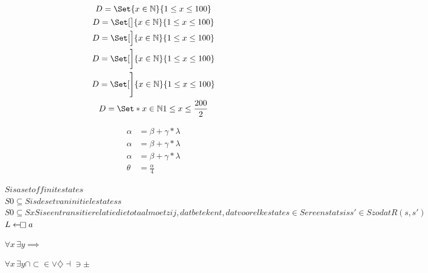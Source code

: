 \documentclass[11pt]{report} %
\newcommand{\numberset}[1]{\mathbb{#1}}
\newcommand{\nat}{\numberset{N}}
\newcommand{\stock}{\gets\mathrel{\mkern-2.4mu\mathop\square}}
\let\mtproforall\forall %
\let\mtproexists\exists %
\begin{document}
\begin{gather*}
D=\Set{x\in\nat}{1\le x\le 100}\\
D=\Set[\big]{x\in\nat}{1\le x\le 100}\\
D=\Set[\Big]{x\in\nat}{1\le x\le 100}\\
D=\Set[\bigg]{x\in\nat}{1\le x\le 100}\\
D=\Set[\Bigg]{x\in\nat}{1\le x\le 100}\\
D=\Set*{x\in\nat}{1\le x\le \frac{200}{2}}
\end{gather*}

\begin{align}
    \alpha &= \beta + \gamma * \lambda \\
     \alpha &= \beta + \gamma * \lambda \\
      \alpha &= \beta + \gamma * \lambda \\
    \theta &= \frac{\alpha}{4}
\end{align} 

%
%
%




$S is a set of finite states$\\
$S0 \subseteq S is de set van initiele statess$ \\
$S0 \subseteq S xS  is een transitie relatie die totaal moet zij, dat betekent, dat voor elke state s \in S er een stats is s' \in S zodat R(s,s')$
$L\stock a$

$\forall x\,\exists y \implies $

$\mtproforall x\,\mtproexists y \cap \subset \in \vee \diamondsuit \dashv \ni \pm$
\end{document}
